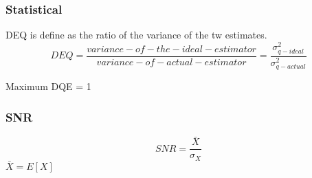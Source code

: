 \subsubsection{Statistical}

DEQ is define as the ratio of the variance of the tw estimates. \\
 \begin{equation*}
     DEQ=\frac{variance-of-the-ideal-estimator}{variance-of-actual-estimator}=\frac{\sigma_{q-ideal}^{2}}{\sigma_{q-actual}^{2}}
 \end{equation*}

 Maximum DQE = 1

\subsubsection{SNR}


 \begin{equation*}
     SNR=\frac{\bar X}{\sigma_{X}}
 \end{equation*}
$\bar X = E[X]$
